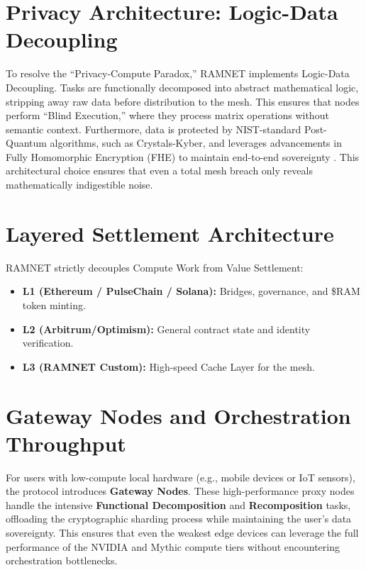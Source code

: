 \documentclass[conference]{IEEEtran}
\begin{document}
\section{Privacy Architecture: Logic-Data Decoupling}
To resolve the ``Privacy-Compute Paradox,'' RAMNET implements Logic-Data Decoupling. Tasks are functionally decomposed into abstract mathematical logic, stripping away raw data before distribution to the mesh. This ensures that nodes perform ``Blind Execution,'' where they process matrix operations without semantic context. Furthermore, data is protected by NIST-standard Post-Quantum algorithms, such as Crystals-Kyber, and leverages advancements in Fully Homomorphic Encryption (FHE) to maintain end-to-end sovereignty \cite{zama2024, nist2024pqc}. This architectural choice ensures that even a total mesh breach only reveals mathematically indigestible noise.

\section{Layered Settlement Architecture}
RAMNET strictly decouples Compute Work from Value Settlement:
\begin{itemize}
    \item \textbf{L1 (Ethereum / PulseChain / Solana):} Bridges, governance, and \$RAM token minting.
    \item \textbf{L2 (Arbitrum/Optimism):} General contract state and identity verification.
    \item \textbf{L3 (RAMNET Custom):} High-speed Cache Layer for the mesh.
\end{itemize}

\section{Gateway Nodes and Orchestration Throughput}
For users with low-compute local hardware (e.g., mobile devices or IoT sensors), the protocol introduces \textbf{Gateway Nodes}. These high-performance proxy nodes handle the intensive \textbf{Functional Decomposition} and \textbf{Recomposition} tasks, offloading the cryptographic sharding process while maintaining the user's data sovereignty. This ensures that even the weakest edge devices can leverage the full performance of the NVIDIA and Mythic compute tiers without encountering orchestration bottlenecks.
\end{document}

